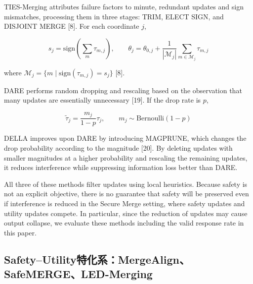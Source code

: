 \documentclass{article}
\begin{document}



TIES-Merging attributes failure factors to minute, redundant updates and sign mismatches, processing them in three stages: TRIM, ELECT SIGN, and DISJOINT MERGE [8]. For each coordinate $j$,

\[
s_j=\mathrm{sign}\left(\sum_m \tau_{m,j}\right),\qquad
\theta_j=\theta_{0,j}+\frac{1}{|\mathcal{M}_j|}\sum_{m\in\mathcal{M}_j}\tau_{m,j}
\tag{6}
\]

where $\mathcal{M}_j=\{m\mid \mathrm{sign}(\tau_{m,j})=s_j\}$ [8].

DARE performs random dropping and rescaling based on the observation that many updates are essentially unnecessary [19]. If the drop rate is $p$,

\[
\tilde{\tau}_j=\frac{m_j}{1-p}\tau_j,\qquad m_j\sim\mathrm{Bernoulli}(1-p)
\tag{7}
\]

DELLA improves upon DARE by introducing MAGPRUNE, which changes the drop probability according to the magnitude [20]. By deleting updates with smaller magnitudes at a higher probability and rescaling the remaining updates, it reduces interference while suppressing information loss better than DARE.

All three of these methods filter updates using local heuristics. Because safety is not an explicit objective, there is no guarantee that safety will be preserved even if interference is reduced in the Secure Merge setting, where safety updates and utility updates compete. In particular, since the reduction of updates may cause output collapse, we evaluate these methods including the valid response rate in this paper.

\subsection{Safety–Utility特化系：MergeAlign、SafeMERGE、LED-Merging}
\end{document}
